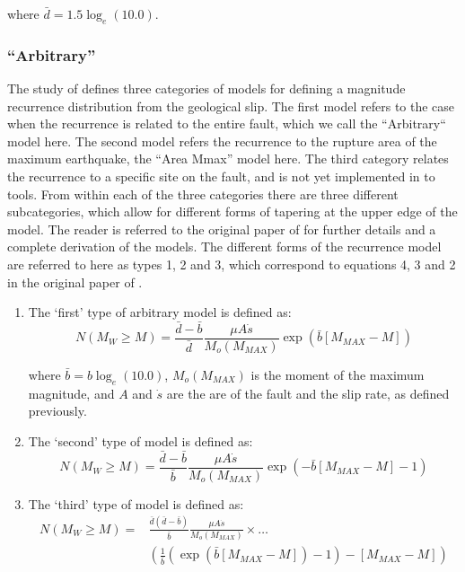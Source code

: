 where $\bar{d} = 1.5 \log_e \left( {10.0} \right)$.

\subsubsection{\cite{AndersonLuco1983} ``Arbitrary''}

The study of \cite{AndersonLuco1983} defines three categories of models for defining a magnitude recurrence distribution from the geological slip. The first model refers to the case when the recurrence is related to the entire fault, which we call the ``Arbitrary`` model here. The second model refers the recurrence to the rupture area of the maximum earthquake, the ``Area Mmax'' model here. The third category relates the recurrence to a specific site on the fault, and is not yet implemented in to tools. From within each of the three categories there are three different subcategories, which allow for different forms of tapering at the upper edge of the model. The reader is referred to the original paper of \cite{AndersonLuco1983} for further details and a complete derivation of the models. The different forms of the recurrence model are referred to here as types 1, 2 and 3, which correspond to equations 4, 3 and 2 in the original paper of \cite{AndersonLuco1983}. 

\begin{enumerate}
\item The `first' type of \cite{AndersonLuco1983} arbitrary model is defined as:
\begin{equation}
N \left( {M_W \geq M} \right) = \frac{\bar{d} - \bar{b}}{\bar{d}} \frac{\mu A \dot{s}}{M_o \left( {M_{MAX}} \right)} \exp \left( {\bar{b} \left[ {M_{MAX} - M} \right]} \right)
\end{equation}

where $\bar{b} = b \log_e \left( {10.0} \right)$, $M_o \left( {M_{MAX}} \right)$ is the moment of the maximum magnitude, and $A$ and $\dot{s}$ are the are of the fault and the slip rate, as defined previously.

\item The `second' type of model is defined as:
\begin{equation}
N \left( {M_W \geq M} \right) = \frac{\bar{d} - \bar{b}}{\bar{b}} \frac{\mu A \dot{s}}{M_o \left( {M_{MAX}} \right)} \exp \left( {-\bar{b} \left[ {M_{MAX} - M} \right] - 1} \right)
\end{equation}

\item The `third' type of model is defined as:
\begin{equation}\begin{split}
N \left( {M_W \geq M} \right) = & \frac{\bar{d} \left( {\bar{d} - \bar{b}} \right)}{\bar{b}} \frac{\mu A \dot{s}}{M_o \left( {M_{MAX}} \right)} \times \ldots \\
&\left( {\frac{1}{\bar{b}} \left( {\exp \left( {\bar{b} \left[ {M_{MAX} - M} \right]} \right) - 1} \right)  - \left[ {M_{MAX} - M} \right]} \right)
\end{split}\end{equation}
\end{enumerate}

